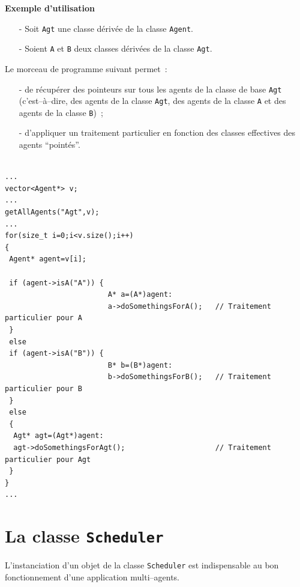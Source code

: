 \documentclass[12pt]{article}
\begin{document}
\vspace{0.3cm}

{\bf Exemple d'utilisation}

\begin{itemize}
\item[-] Soit {\tt Agt} une classe d\'eriv\'ee de la classe {\tt Agent}.
\item[-] Soient {\tt A} et {\tt B} deux classes d\'eriv\'ees de la
classe {\tt Agt}.
\end{itemize}

Le morceau de programme suivant permet~:

\begin{itemize}
\item[-] de r\'ecup\'erer des pointeurs
sur tous les agents de la classe de base {\tt Agt}
(c'est--\`a--dire,
des agents de la classe {\tt Agt},
des agents de la classe {\tt A}
et des agents de la classe {\tt B})~;

\item[-] d'appliquer un traitement
particulier en fonction des classes
effectives des agents ``point\'es''.

\end{itemize}

\begin{footnotesize}
\begin{verbatim}

...
vector<Agent*> v;
...
getAllAgents("Agt",v);
...
for(size_t i=0;i<v.size();i++)
{
 Agent* agent=v[i];

 if (agent->isA("A")) { 
                        A* a=(A*)agent: 
                        a->doSomethingsForA();   // Traitement particulier pour A
 }
 else
 if (agent->isA("B")) { 
                        B* b=(B*)agent: 
                        b->doSomethingsForB();   // Traitement particulier pour B
 }
 else
 {
  Agt* agt=(Agt*)agent:
  agt->doSomethingsForAgt();                     // Traitement particulier pour Agt
 }
}
...
\end{verbatim}
\end{footnotesize}

\section{La classe {\tt Scheduler}}

\vspace{0.3cm}

L'instanciation d'un objet de la classe {\tt Scheduler}
est indispensable au bon fonctionnement d'une application
multi--agents.
\end{document}
